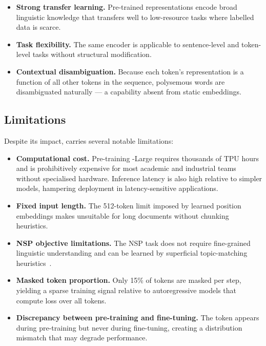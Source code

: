 \begin{itemize}
  \item \textbf{Strong transfer learning.}  Pre-trained \bert{} representations
        encode broad linguistic knowledge that transfers well to low-resource tasks
        where labelled data is scarce.

  \item \textbf{Task flexibility.}  The same encoder is applicable to sentence-level
        and token-level tasks without structural modification.

  \item \textbf{Contextual disambiguation.}  Because each token's representation
        is a function of all other tokens in the sequence, polysemous words are
        disambiguated naturally --- a capability absent from static embeddings.
\end{itemize}

\subsection{Limitations}
\label{subsec:limitations}

Despite its impact, \bert{} carries several notable limitations:

\begin{itemize}
  \item \textbf{Computational cost.}  Pre-training \bert{}-Large requires thousands
        of TPU hours and is prohibitively expensive for most academic and industrial
        teams without specialised hardware.  Inference latency is also high relative
        to simpler models, hampering deployment in latency-sensitive applications.

  \item \textbf{Fixed input length.}  The 512-token limit imposed by learned
        position embeddings makes \bert{} unsuitable for long documents without
        chunking heuristics.

  \item \textbf{NSP objective limitations.}  The NSP task does not require
        fine-grained linguistic understanding and can be learned by superficial
        topic-matching heuristics~\cite{liu2019roberta}.

  \item \textbf{Masked token proportion.}  Only 15\% of tokens are masked per
        step, yielding a sparse training signal relative to autoregressive models
        that compute loss over all tokens.

  \item \textbf{Discrepancy between pre-training and fine-tuning.}  The \mask{}
        token appears during pre-training but never during fine-tuning, creating a
        distribution mismatch that may degrade performance.
\end{itemize}


